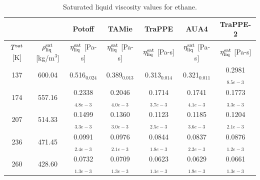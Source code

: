 \documentclass[preprint,review,12pt]{elsarticle}
\begin{document}
	\begin{table}[h!]
		\caption{Saturated liquid viscosity values for ethane.}
		\begin{center}
			\begin{tabular}{|c|c|c|c|c|c|c|}
				\hline
				&                                       & Potoff            & TAMie             & TraPPE 	& AUA4	& TraPPE-2            \\ \hline
				$T^{\rm sat}$ {[}K{]} & $\rho^{\rm sat}_{\rm liq}$ [kg/m$^3$] & $\eta_{\rm liq}^{\rm sat}$ {[}Pa-s{]} & $\eta_{\rm liq}^{\rm sat}$ {[}Pa-s{]} & $\eta_{\rm liq}^{\rm sat}$ {[}Pa-s{]} & $\eta_{\rm liq}^{\rm sat}$ {[}Pa-s{]} & $\eta_{\rm liq}^{\rm sat}$ {[}Pa-s{]} \\ \hline
				137 & 600.04 & 0.516$_{0.024}$   & 0.389$_{0.013}$   & 0.313$_{0.014}$   & 0.321$_{0.011}$   & 0.2981$_{8.5e-3}$ \\ \hline
				174 & 557.16 & 0.2338$_{4.8e-3}$ & 0.2046$_{4.0e-3}$ & 0.1714$_{3.7e-3}$ & 0.1741$_{4.1e-3}$ & 0.1773$_{3.3e-3}$ \\ \hline
				207 & 514.33 & 0.1499$_{3.3e-3}$ & 0.1360$_{3.0e-3}$ & 0.1123$_{2.5e-3}$ & 0.1185$_{3.6e-3}$ & 0.1204$_{2.1e-3}$ \\ \hline
				236 & 471.45 & 0.0991$_{2.4e-3}$ & 0.0976$_{2.1e-3}$ & 0.0844$_{1.8e-3}$ & 0.0837$_{2.2e-3}$ & 0.0876$_{1.2e-3}$ \\ \hline
				260 & 428.60 & 0.0732$_{1.3e-3}$ & 0.0709$_{1.3e-3}$ & 0.0623$_{1.1e-3}$ & 0.0629$_{1.9e-3}$ & 0.0661$_{1.3e-3}$ \\ \hline
			\end{tabular}
		\end{center}
	\end{table}
\end{document}
